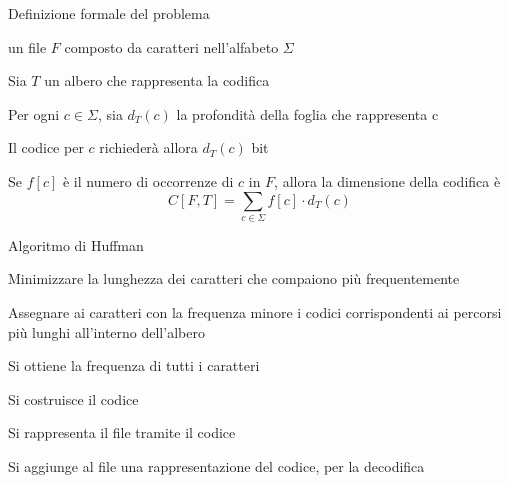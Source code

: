 \begin{frame}{Definizione formale del problema}

\vspace{-9pt}
\begin{myboxtitle}[Input]
\BI
\item un file $F$ composto da caratteri nell'alfabeto $\Sigma$
\EI
\end{myboxtitle}

\begin{myboxtitle}
\BI
\item Sia $T$ un albero che rappresenta la codifica
\item Per ogni $c \in \Sigma$, sia $d_T(c)$ la profondità della foglia che rappresenta c
\item Il codice per $c$ richiederà allora $d_T(c)$ bit
\item Se $f[c]$ è il numero di occorrenze di  $c$ in $F$, allora la dimensione della codifica è 
\[
  C[F,T] = \sum_{c \in \Sigma} f[c] \cdot d_T(c)
\]
\EI
\end{myboxtitle}

\end{frame}

\begin{frame}{Algoritmo di Huffman}

\vspace{-9pt}
\begin{myboxtitle}
\BIL
\item Minimizzare la lunghezza dei caratteri che compaiono più frequentemente
\item Assegnare ai caratteri con la frequenza minore i codici corrispondenti ai percorsi più lunghi all'interno dell'albero
\EIL
\end{myboxtitle}

\begin{myboxtitle}
\BIL
\item Si ottiene la frequenza di tutti i caratteri
\item Si costruisce il codice
\item Si rappresenta il file tramite il codice
\item Si aggiunge al file una rappresentazione del codice, per la decodifica
\EIL
\end{myboxtitle}

\end{frame}



